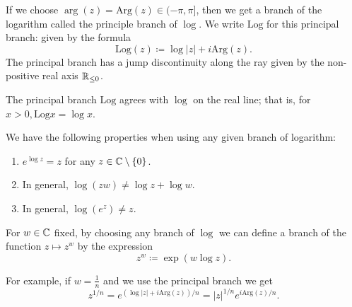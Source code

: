 \documentclass[10pt, a4paper]{article}
\begin{document}
If we choose $\arg(z) = \mathrm{Arg}(z) \in (-\pi, \pi]$,
then we get a branch of the logarithm called the principle branch of $\log$.
We write $\mathrm{Log}$ for this principal branch:
given by the formula
\[
\mathrm{Log}(z) \coloneqq \log{|z|} + i\mathrm{Arg}(z).
\]
The principal branch has a jump discontinuity along the ray given by the non-positive real axis $\mathbb{R}_{\leq 0}$.

\begin{remark}
    The principal branch $\mathrm{Log}$ agrees with $\log$ on the real line;
    that is,
    for $x > 0, \mathrm{Log}{x} = \log{x}$.
\end{remark}

\begin{lemma}
    We have the following properties when using any given branch of logarithm:
    \begin{enumerate}[label = \arabic*.]
        \item $e ^ {\log{z}} = z$ for any $z \in \mathbb{C} \setminus \{0\}$.

        \item In general,
        $\log(zw) \neq \log{z} + \log{w}$.

        \item In general,
        $\log(e ^ {z}) \neq z$.
    \end{enumerate}
\end{lemma}

\begin{definition}
    For $w \in \mathbb{C}$ fixed,
    by choosing any branch of $\log$ we can define a branch of the function $z \mapsto z ^ w$ by the expression
    \[
    z ^ w \coloneqq \exp(w\log{z}).
    \]
\end{definition}

For example,
if $w = \frac{1}{n}$ and we use the principal branch we get
\[
z ^ {1 / n} = e ^ {(\log{|z|} + i\mathrm{Arg}(z)) / n} = |z| ^ {1 / n}e ^ {i\mathrm{Arg}(z) / n}.
\]
\end{document}
